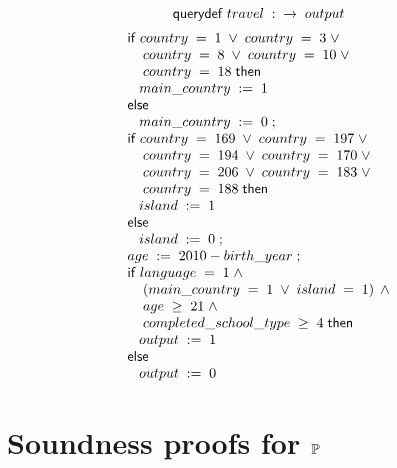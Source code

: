 $$ \mathsf{querydef} \; travel \; : \; \; \rightarrow \; output$$
\begin{displaymath}{\small
\begin{array}{l}
  \sifk \; country \; = \; 1 \; \vee \; country \; = \; 3 \; \vee \\
  \;\;\;\; country \; = \; 8 \; \vee \; country \; = \; 10 \; \vee \\
  \;\;\;\; country \; = \; 18 \; \sthenk\\
  \;\;\;\sassign{main\text{\_}country}{1}\\
  \selsek\\
  \;\;\;\sassign{main\text{\_}country}{0}\; ;\\
  \sifk \; country \; = \; 169 \; \vee \; country \; = \;
  197 \; \vee \\
  \;\;\;\; country \; = \; 194 \; \vee \; country \; = \;
  170 \; \vee \\
  \;\;\;\; country \; = \; 206 \; \vee \; country \; = \;
  183 \; \vee \\
  \;\;\;\; country \; = \; 188 \; \sthenk\\
  \;\;\;\sassign{island}{1}\\
  \selsek\\
  \;\;\;\sassign{island}{0}\; ;\\
  \sassign{age}{\ebinop{-}{2010}{birth\text{\_}year}}\; ;\\
  \sifk \; language \; = \; 1 \; \wedge \\
  \;\;\;\; \paren{main\text{\_}country \; = \; 1 \; \vee \; island \;
  = \; 1} \; \wedge \\
  \;\;\;\; age \; \geq \; 21 \; \wedge \\
  \;\;\;\; completed\text{\_}school\text{\_}type \; \geq \; 4 \; \sthenk\\
  \;\;\;\sassign{output}{1}\\
  \selsek\\
  \;\;\;\sassign{output}{0}\\
\end{array}
}
\end{displaymath}

\section{Soundness proofs for $ \mathbb{P} $} \label{appendix:proof1}



